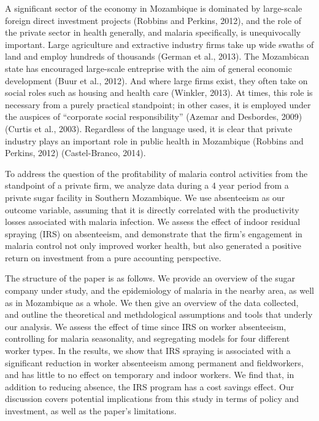 \documentclass[]{article}
\begin{document}
A significant sector of the economy in Mozambique is dominated by
large-scale foreign direct investment projects (Robbins and Perkins,
2012), and the role of the private sector in health generally, and
malaria specifically, is unequivocally important. Large agriculture and
extractive industry firms take up wide swaths of land and employ
hundreds of thousands (German et al., 2013). The Mozambican state has
encouraged large-scale entreprise with the aim of general economic
development (Buur et al., 2012). And where large firms exist, they often
take on social roles such as housing and health care (Winkler, 2013). At
times, this role is necessary from a purely practical standpoint; in
other cases, it is employed under the auspices of ``corporate social
responsibility'' (Azemar and Desbordes, 2009) (Curtis et al., 2003).
Regardless of the language used, it is clear that private industry plays
an important role in public health in Mozambique (Robbins and Perkins,
2012) (Castel-Branco, 2014).

To address the question of the profitability of malaria control
activities from the standpoint of a private firm, we analyze data during
a 4 year period from a private sugar facility in Southern Mozambique. We
use absenteeism as our outcome variable, assuming that it is directly
correlated with the productivity losses associated with malaria
infection. We assess the effect of indoor residual spraying (IRS) on
absenteeism, and demonstrate that the firm's engagement in malaria
control not only improved worker health, but also generated a positive
return on investment from a pure accounting perspective.

The structure of the paper is as follows. We provide an overview of the
sugar company under study, and the epidemiology of malaria in the nearby
area, as well as in Mozambique as a whole. We then give an overview of
the data collected, and outline the theoretical and methdological
assumptions and tools that underly our analysis. We assess the effect of
time since IRS on worker absenteeism, controlling for malaria
seasonality, and segregating models for four different worker types. In
the results, we show that IRS spraying is associated with a significant
reduction in worker absenteeism among permanent and fieldworkers, and
has little to no effect on temporary and indoor workers. We find that,
in addition to reducing absence, the IRS program has a cost savings
effect. Our discussion covers potential implications from this study in
terms of policy and investment, as well as the paper's limitations.
\end{document}
